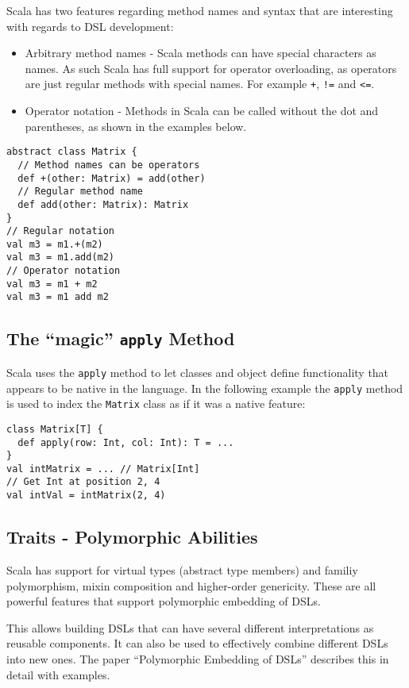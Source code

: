 \documentclass[a4paper,english]{report}
\begin{document}
Scala has two features regarding method names and syntax that are
interesting with regards to DSL development:

\begin{itemize}
\item Arbitrary method names - Scala methods can have special
  characters as names. As such Scala has full support for operator
  overloading, as operators are just regular methods with special
  names. For example \texttt{+}, \texttt{!=} and \texttt{<=}.
\item Operator notation - Methods in Scala can be called without the
  dot and parentheses, as shown in the examples below.
\end{itemize}

\begin{lstlisting}
abstract class Matrix {
  // Method names can be operators
  def +(other: Matrix) = add(other)
  // Regular method name
  def add(other: Matrix): Matrix
}
// Regular notation
val m3 = m1.+(m2)
val m3 = m1.add(m2)
// Operator notation
val m3 = m1 + m2
val m3 = m1 add m2
\end{lstlisting}

\subsection{The ``magic'' \texttt{apply} Method}

Scala uses the \texttt{apply} method to let classes and object define
functionality that appears to be native in the language. In the
following example the \texttt{apply} method is used to index the
\texttt{Matrix} class as if it was a native feature:

\begin{lstlisting}
class Matrix[T] {
  def apply(row: Int, col: Int): T = ...
}
val intMatrix = ... // Matrix[Int]
// Get Int at position 2, 4
val intVal = intMatrix(2, 4)
\end{lstlisting}

\subsection{Traits - Polymorphic Abilities}

Scala has support for virtual types (abstract type members) and
familiy polymorphism\cite{ode03}, mixin composition\cite{ode05} and
higher-order genericity\cite{moo08}. These are all powerful features
that support polymorphic embedding of DSLs\cite{hof08}.

This allows building DSLs that can have several different
interpretations as reusable components. It can also be used to
effectively combine different DSLs into new ones. The paper
``Polymorphic Embedding of DSLs''\cite{hof08} describes this in detail
with examples.
\end{document}
